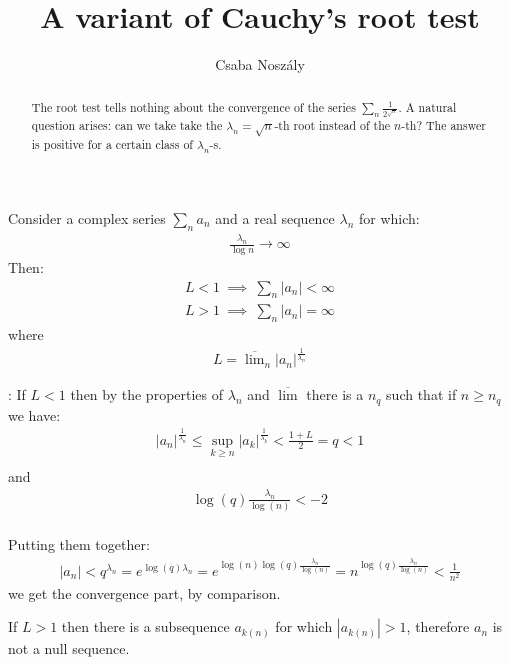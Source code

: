 \documentclass{article}
\author{Csaba Noszály}
\title{A variant of Cauchy's root test}
\begin{document}
\maketitle

\begin{abstract}
The root test tells nothing about the convergence of the series $\sum_n \frac{1}{2^{\sqrt{n}}}$. A natural question arises: 
can we take take the $\lambda_n=\sqrt{n}$-th root instead of the $n$-th? The answer is positive for a certain class of $\lambda_n$-s.
\end{abstract}


\vspace{0.2cm}
\newline
\noindent Consider a complex series $\sum_n a_n$ and a real sequence $\lambda_n$ for which:
\begin{gather*}
\frac{\lambda_n}{\log{n}}\to \infty
\end{gather*}
Then:
\begin{gather*}
L<1 \ \implies \ \sum_n |a_n|< \infty \\
L>1 \ \implies \ \sum_n |a_n|= \infty
\end{gather*}
where
\begin{gather*}
L={\overline{\lim}}_n |a_n|^{\frac{1}{\lambda_n}}
\end{gather*}


\vspace{0.2cm}
: \newline If $L<1$ then by the properties of $\lambda_n$ and $\overline{\lim}$ there is a $n_q$ such that if $n\ge n_q$ we have:
\begin{gather*}
    |a_n|^{\frac{1}{\lambda_n}}\le \sup_{k\ge n} |a_k|^{\frac{1}{\lambda_k}}< \frac{1+L}{2}=q<1 \\
\end{gather*}
and
\begin{gather*}
  \log(q)\frac{\lambda_n}{\log(n)}<-2 \\
\end{gather*}

\noindent Putting them together:
\begin{gather*}
|a_n| < q^{\lambda_n} = 
e^{\log(q)\lambda_n} = e^{\log(n) \log(q)\frac{\lambda_n}{\log(n)}} = n^{\log(q)\frac{\lambda_n}{\log(n)}}< \frac{1}{n^2} 
\end{gather*}
we get the convergence part, by comparison.


\vspace{0.2cm}
\noindent If $L>1$ then there is a subsequence $a_{k(n)}$ for which $|a_{k(n)}|>1$, therefore $a_n$ is not a null sequence.
\end{document}
